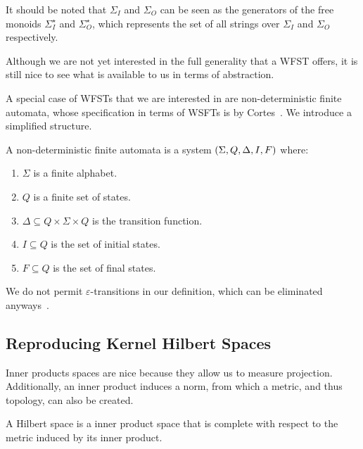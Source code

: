 \documentclass[12pt]{article}
\begin{document}
It should be noted that \(\Sigma_I\) and \(\Sigma_O\) can be
seen as the generators of the free monoids
\(\Sigma_I ^\star\) and \(\Sigma_O ^\star\),
which represents the set of all strings over
\(\Sigma_I\) and \(\Sigma_O\) respectively.

Although we are not yet interested in the full generality that
a WFST offers, it is still nice to see what is available to us
in terms of abstraction.

A special case of WFSTs that we are interested in
are non-deterministic finite automata,
whose specification in terms of WSFTs
is by Cortes~\cite{cortes2004rational}.
We introduce a simplified structure.

\begin{definition}
  A non-deterministic finite automata is a system
  \(\left(\Sigma, Q, \Delta, I, F\right)\) where:

  \begin{enumerate}
    \item
      \(\Sigma\) is a finite alphabet.

    \item
      \(Q\) is a finite set of states.

    \item
      \(\Delta \subseteq Q \times \Sigma \times Q\)
      is the transition function.

    \item
      \(I \subseteq Q\) is the set of initial states.

    \item
      \(F \subseteq Q\) is the set of final states.

  \end{enumerate}
\end{definition}

We do not permit \(\varepsilon\)-transitions in our definition,
which can be eliminated anyways~\cite{savage1998models}.



\subsection{Reproducing Kernel Hilbert Spaces}

Inner products spaces are nice because they allow us to measure projection.
Additionally, an inner product induces a norm, from which a metric,
and thus topology, can also be created.

\begin{definition}
  A Hilbert space is a inner product space that is complete with respect
  to the metric induced by its inner product.
\end{definition}
\end{document}
